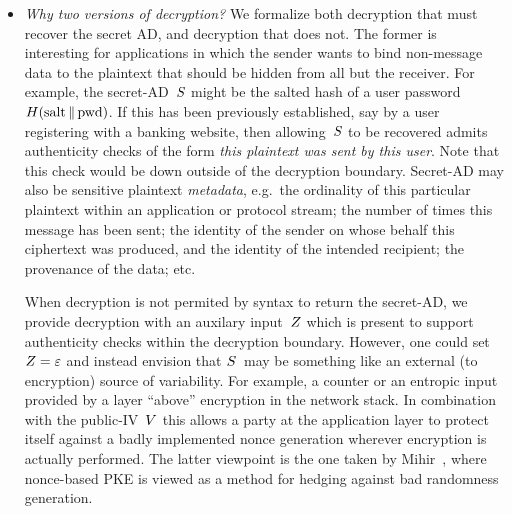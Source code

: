 \begin{itemize}
\item\emph{Why two versions of decryption?}  We formalize both decryption that must recover the secret AD, and decryption that does not.  The former is interesting for applications in which the sender wants to bind non-message data to the plaintext that should be hidden from all but the receiver.  For example, the secret-AD~$S$ might be the salted hash of a user password $H(\mathrm{salt} \,\|\, \mathrm{pwd})$.  If this has been previously established, say by a user registering with a banking website, then allowing~$S$ to be recovered admits authenticity checks of the form \emph{this plaintext was sent by this user}.  Note that this check would be down outside of the decryption boundary.  Secret-AD may also be sensitive plaintext \emph{metadata}, e.g.\ the ordinality of this particular plaintext within an application or protocol stream; the number of times this message has been sent; the identity of the sender on whose behalf this ciphertext was produced, and the identity of the intended recipient; the provenance of the data; etc. 

When decryption is not permited by syntax to return the secret-AD, we provide decryption with an auxilary input~$Z$ which is present to support authenticity checks within the decryption boundary.  However, one could set~$Z=\varepsilon$ and instead envision that $S$~may be something like an external (to encryption) source of variability.  For example, a counter or an entropic input provided by a layer ``above'' encryption in the network stack.  In combination with the public-IV~$V$ this allows a party at the application layer to protect itself against a badly implemented nonce generation wherever encryption is actually performed.  
The latter viewpoint is the one taken by Mihir~\cite{mihir}, where nonce-based PKE is viewed as a method for hedging against bad randomness generation.



\end{itemize}
